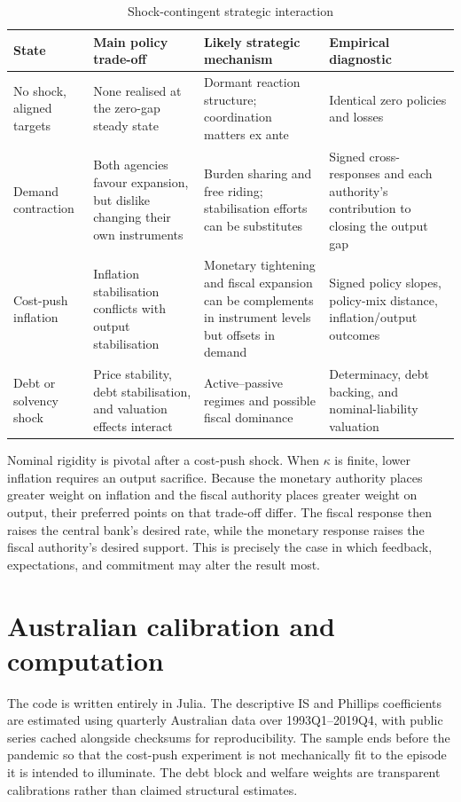 \documentclass[11pt]{article}
\begin{document}
\begin{table}[htbp]
\centering
\caption{Shock-contingent strategic interaction}
\label{tab:taxonomy}
\small
\begin{tabular}{P{0.17\textwidth}P{0.235\textwidth}P{0.245\textwidth}P{0.24\textwidth}}
\toprule
State & Main policy trade-off & Likely strategic mechanism & Empirical diagnostic\\
\midrule
No shock, aligned targets & None realised at the zero-gap steady state
& Dormant reaction structure; coordination matters ex ante
& Identical zero policies and losses\\
Demand contraction & Both agencies favour expansion, but dislike changing
their own instruments & Burden sharing and free riding; stabilisation efforts
can be substitutes & Signed cross-responses and each authority's contribution
to closing the output gap\\
Cost-push inflation & Inflation stabilisation conflicts with output
stabilisation & Monetary tightening and fiscal expansion can be complements in
instrument levels but offsets in demand & Signed policy slopes, policy-mix
distance, inflation/output outcomes\\
Debt or solvency shock & Price stability, debt stabilisation, and valuation
effects interact & Active--passive regimes and possible fiscal dominance
& Determinacy, debt backing, and nominal-liability valuation\\
\bottomrule
\end{tabular}
\end{table}

Nominal rigidity is pivotal after a cost-push shock.  When $\kappa$ is finite,
lower inflation requires an output sacrifice.  Because the monetary authority
places greater weight on inflation and the fiscal authority places greater
weight on output, their preferred points on that trade-off differ.  The fiscal
response then raises the central bank's desired rate, while the monetary
response raises the fiscal authority's desired support.  This is precisely the
case in which feedback, expectations, and commitment may alter the result most.

\section{Australian calibration and computation}

The code is written entirely in Julia.  The descriptive IS and Phillips
coefficients are estimated using quarterly Australian data over 1993Q1--2019Q4,
with public series cached alongside checksums for reproducibility.  The sample
ends before the pandemic so that the cost-push experiment is not mechanically
fit to the episode it is intended to illuminate.  The debt block and welfare
weights are transparent calibrations rather than claimed structural estimates.
\end{document}
